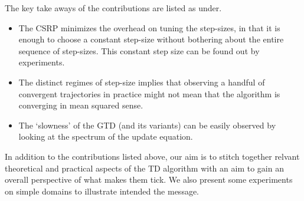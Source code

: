 The key take aways of the contributions are listed as under.
\begin{itemize}[leftmargin=*]
\item  The CSRP minimizes the overhead on tuning the step-sizes, in that it is enough to choose a constant step-size without bothering about the entire sequence of step-sizes. This constant step size can be found out by experiments.
\item The distinct regimes of step-size implies that observing a handful of convergent trajectories in practice might not mean that the algorithm is converging in mean squared sense.
\item The `slowness' of the GTD (and its variants) can be easily observed by looking at the spectrum of the update equation.
\end{itemize}
In addition to the contributions listed above, our aim is to stitch together relvant theoretical and practical aspects of the TD algorithm with an aim to gain an overall perspective of what makes them tick. We also present some experiments on simple domains to illustrate intended the message.
